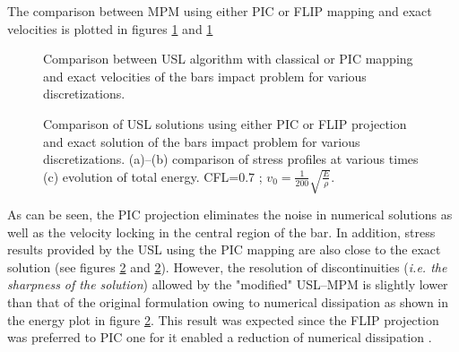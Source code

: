 The comparison between MPM using either PIC or FLIP mapping and exact velocities is plotted in figures \ref{fig:MPM_velocities} and \ref{fig:MPM_velocities}
\begin{figure}[h!]
  \centering
  { \label{subfig:MPM_velo_10}}
  { \label{subfig:MPM_velo_25}}
  \caption{Comparison between USL algorithm with classical or PIC mapping and exact velocities of the bars impact problem for various discretizations.}
  \label{fig:MPM_velocities}
\end{figure}
\begin{figure}[h!]
  \centering
  {  \label{subfig:mpm_diffusion_10}}
  {  \label{subfig:mpm_diffusion_25}}
  {  \label{subfig:mpm_energies}}
  \caption{Comparison of USL solutions using either PIC or FLIP projection and exact solution of the bars impact problem for various discretizations. (a)--(b) comparison of stress profiles at various times (c) evolution of total energy. CFL=$0.7$ ; $v_0=\frac{1}{200}\sqrt{\frac{E}{\rho}}$.}
  \label{fig:mpm_diffusion}
\end{figure}
As can be seen, the PIC projection eliminates the noise in numerical solutions as well as the velocity locking in the central region of the bar.
In addition, stress results provided by the USL using the PIC mapping are also close to the exact solution (see figures \ref{fig:mpm_diffusion} and \ref{fig:mpm_diffusion}).
However, the resolution of discontinuities (\textit{i.e. the sharpness of the solution}) allowed by the "modified" USL--MPM is slightly lower than that of the original formulation owing to numerical dissipation as shown in the energy plot in figure \ref{fig:mpm_diffusion}.
This result was expected since the FLIP projection was preferred to PIC one for it enabled a reduction of numerical dissipation \cite{PIC_Nishiguchi}.

 
